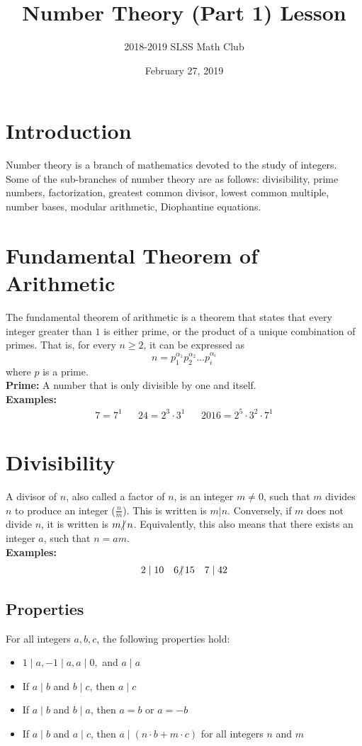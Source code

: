 \documentclass[12pt]{article}
\title{Number Theory (Part 1) Lesson\vspace{-3mm}}
\author{2018-2019 SLSS Math Club\vspace{-5mm}}
\date{February 27, 2019\vspace{-5mm}}
\newcommand{\ndiv}{\hspace{-4pt}\not|\hspace{2pt}}
\newcommand{\tdiv}{\; | \;}
\begin{document}
\maketitle

\section{Introduction}
Number theory is a branch of mathematics devoted to the study of integers. Some of the sub-branches of number theory are as follows: divisibility, prime numbers, factorization, greatest common divisor, lowest common multiple, number bases, modular arithmetic, Diophantine equations.

\section{Fundamental Theorem of Arithmetic}
The fundamental theorem of arithmetic is a theorem that states that every integer greater than $1$ is either prime, or the product of a unique combination of primes. That is, for every $n \geq 2$, it can be expressed as $$n = p_1^{\alpha_1}p_2^{\alpha_2}\dots p_i^{\alpha_i}$$ where $p$ is a prime. \\

\textbf{Prime:} A number that is only divisible by one and itself. \\

\textbf{Examples:}
\begin{align*}
    7 = 7^1  && 24 = 2^3 \cdot 3^1 && 2016 = 2^5 \cdot 3^2 \cdot 7^1 
\end{align*}

\section{Divisibility}
A divisor of $n$, also called a factor of $n$, is an integer $m \neq 0$, such that $m$ divides $n$ to produce an integer ($\frac{n}{m}$). This is written is $m | n$. Conversely, if $m$ does not divide $n$, it is written is $m \ndiv n$. Equivalently, this also means that there exists an integer $a$, such that $n = am$. \\

\textbf{Examples:}
\begin{align*}
    2 \tdiv 10 && 6 \ndiv 15 && 7  \tdiv 42
\end{align*}

\subsection{Properties}
For all integers $a, b, c$, the following properties hold: 
\begin{itemize}
    \item $1  \tdiv a, -1  \tdiv a, a  \tdiv 0,$ and $a  \tdiv a$
    \item If $a  \tdiv b$ and $b  \tdiv c$, then $a  \tdiv c$
    \item If $a  \tdiv b$ and $b   \tdiv a$, then $a = b$ or $a = -b$
    \item If $a  \tdiv b$ and $a  \tdiv c$, then $a   \tdiv (n \cdot b + m \cdot c)$ for all integers $n$ and $m$
\end{itemize}
\end{document}
